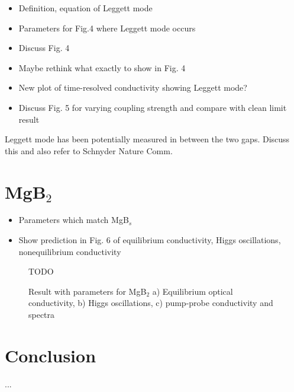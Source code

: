\documentclass[aps,prb,reprint,noeprint,superscriptaddress]{revtex4-1}
\begin{document}
\begin{itemize}
	\item Definition, equation of Leggett mode
	\item Parameters for Fig.4 where Leggett mode occurs
	\item Discuss Fig. 4
	\item Maybe rethink what exactly to show in Fig. 4
	\item New plot of time-resolved conductivity showing Leggett mode?
\end{itemize}


\begin{itemize}
	\item Discuss Fig. 5 for varying coupling strength and compare with clean limit result
\end{itemize}

Leggett mode has been potentially measured in between the two gaps. Discuss this
and also refer to Schnyder Nature Comm. 
 

\section{MgB$_2$}
\label{sec:mgb2}

\begin{itemize}
	\item Parameters which match MgB$_s$
	\item Show prediction in Fig. 6 of equilibrium conductivity, Higgs oscillations, nonequilibrium conductivity
\end{itemize}

\begin{figure}[H]
    \centering
    \Huge{TODO}
    \caption{\label{fig:mgb2}%
    Result with parameters for MgB$_2$ a) Equilibrium optical conductivity, b) Higgs oscillations, c) pump-probe conductivity and spectra}
\end{figure}%



\section{Conclusion}
\label{sec:conclusion}

...
\end{document}
